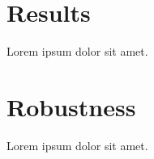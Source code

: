 \documentclass[11pt]{article}
\begin{document}

\section{Results}
Lorem ipsum dolor sit amet.

\section{Robustness}
Lorem ipsum dolor sit amet.
\end{document}
